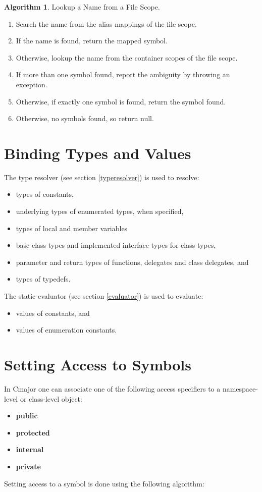 \documentclass[a4paper,oneside,11pt]{book}
\theoremstyle{definition}
\newtheorem{algo}{Algorithm}[section]
\begin{document}
\begin{algo}\label{lookupfilescope} Lookup a Name from a File Scope.
\begin{enumerate}
\item
Search the name from the alias mappings of the file scope.
\item
If the name is found, return the mapped symbol.
\item
Otherwise, lookup the name from the container scopes of the file scope.
\item
If more than one symbol found, report the ambiguity by throwing an exception.
\item
Otherwise, if exactly one symbol is found, return the symbol found.
\item
Otherwise, no symbols found, so return null.
\end{enumerate}
\end{algo}

\section{Binding Types and Values}

The type resolver (see section \ref{typeresolver}) is used to resolve:
\begin{itemize}
\item
types of constants,
\item
underlying types of enumerated types, when specified,
\item
types of local and member variables
\item
base class types and implemented interface types for class types,
\item
parameter and return types of functions, delegates and class delegates, and
\item
types of typedefs.
\end{itemize}

The static evaluator (see section \ref{evaluator}) is used to evaluate:
\begin{itemize}
\item
values of constants, and
\item
values of enumeration constants.
\end{itemize}

\section{Setting Access to Symbols}

In Cmajor one can associate one of the following access specifiers to a namespace-level or class-level object:
\begin{itemize}
\item
\textbf{public}
\item
\textbf{protected}
\item
\textbf{internal}
\item
\textbf{private}
\end{itemize}
Setting access to a symbol is done using the following algorithm:
\end{document}
